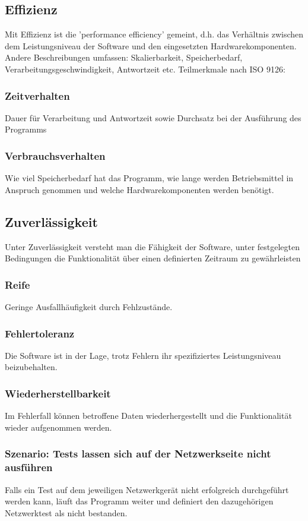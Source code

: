 \documentclass[
	ngerman,
	toc=listof, %
	toc=bibliography, %
	footnotes=multiple, %
	parskip=half, %
	numbers=noendperiod %
]{scrartcl}
\begin{document}
	\subsection{Effizienz}
	Mit Effizienz ist die 'performance efficiency' gemeint, d.h. das Verhältnis zwischen dem Leistungsniveau der Software und den eingesetzten Hardwarekomponenten. 
	Andere Beschreibungen umfassen: Skalierbarkeit, Speicherbedarf, Verarbeitungsgeschwindigkeit, Antwortzeit etc.
	Teilmerkmale nach ISO 9126:

		\subsubsection{Zeitverhalten}
		Dauer für Verarbeitung und Antwortzeit sowie Durchsatz bei der Ausführung des Programms

		\subsubsection{Verbrauchsverhalten}
		Wie viel Speicherbedarf hat das Programm, wie lange werden Betriebsmittel in Anspruch genommen und welche Hardwarekomponenten werden benötigt.

	\subsection{Zuverlässigkeit}
	Unter Zuverlässigkeit versteht man die Fähigkeit der Software, unter festgelegten Bedingungen die Funktionalität über einen definierten Zeitraum zu gewährleisten
	
		\subsubsection{Reife}
		Geringe Ausfallhäufigkeit durch Fehlzustände.

		\subsubsection{Fehlertoleranz}
		Die Software ist in der Lage, trotz Fehlern ihr spezifiziertes Leistungsniveau beizubehalten.

		\subsubsection{Wiederherstellbarkeit}
		Im Fehlerfall können betroffene Daten wiederhergestellt und die Funktionalität wieder aufgenommen werden.

		\subsubsection{Szenario: Tests lassen sich auf der Netzwerkseite nicht ausführen}
		Falls ein Test auf dem jeweiligen Netzwerkgerät nicht erfolgreich durchgeführt werden kann, läuft das Programm weiter und definiert den dazugehörigen Netzwerktest als nicht bestanden.
		
\end{document}
